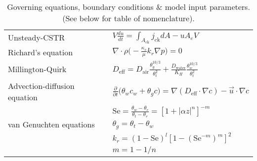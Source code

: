 \documentclass[journal=esthag,manuscript=article]{achemso}
\begin{document}
\begin{table}[htb!]
 \centering
 \caption{Governing equations, boundary conditions \& model input parameters. (See below for table of nomenclature).}
 \label{tbl:eqns_bc_parameters}
 \bigskip
 \begin{tabular}{l l}
  \toprule
  Unsteady-CSTR                            & $V\frac{d u}{d t} = \int_{A_\mathrm{ck}} j_\mathrm{ck} dA - u A_e V$                                                                  \\
  Richard's equation                       & $\nabla \cdot \rho \Big( - \frac{\kappa_s}{\mu} k_r \nabla p \Big) = 0$                                                               \\
  Millington-Quirk                         & $D_\mathrm{eff} = D_\mathrm{air}\frac{\theta_g^{10/3}}{\theta_t^2} + \frac{D_\mathrm{water}}{K_H} \frac{\theta_w^{10/3}}{\theta_t^2}$ \\
  Advection-diffusion equation             & $\frac{\partial}{\partial t} \Big( \theta_w c_w + \theta_g c \Big) = \nabla (D_\mathrm{eff} \cdot \nabla c) - \vec{u} \cdot \nabla c$ \\
  \multirow{3}{*}{van Genuchten equations} & $\mathrm{Se} = \frac{\theta_w - \theta_r}{\theta_t - \theta_r} = [1 + |\alpha z|^n]^{-m}$                                             \\
                                           & $\theta_g = \theta_t - \theta_w$                                                                                                      \\
                                           & $k_r = (1 - \mathrm{Se})^{l} [1 - (\mathrm{Se}^{-m})^m]^2$                                                                            \\
                                           & $m = 1 - 1/n$                                                                                                                         \\
  \bottomrule
 \end{tabular}
 \bigskip

\end{table}
\end{document}
